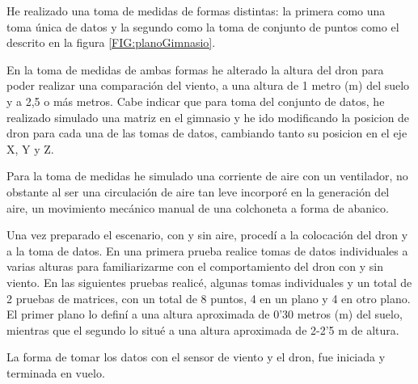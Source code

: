 
He realizado una toma de medidas de formas distintas: la primera como una toma única de datos y la segundo como la toma de conjunto de puntos como el descrito en la figura \ref{FIG:planoGimnasio}.

En la toma de medidas de ambas formas he alterado la altura del dron para poder realizar una comparación del viento, a una altura de 1 metro (m) del suelo y a 2,5 o más metros. Cabe indicar que para toma del conjunto de datos, he realizado simulado una matriz en el gimnasio y he ido modificando la posicion de dron para cada una de las tomas de datos, cambiando tanto su posicion en el eje X, Y y Z.

Para la toma de medidas he simulado una corriente de aire con un ventilador, no obstante al ser una circulación de aire tan leve incorporé en la generación del aire, un movimiento mecánico manual de una colchoneta a forma de abanico.

Una vez preparado el escenario, con y sin aire, procedí a la colocación del dron y a la toma de datos. En una primera prueba realice tomas de datos individuales a varias alturas para familiarizarme con el comportamiento del dron con y sin viento. En las siguientes pruebas realicé, algunas tomas individuales y un total de 2 pruebas de matrices, con un total de 8 puntos, 4 en un plano y 4 en otro plano. El primer plano lo definí a una altura aproximada de 0'30 metros (m) del suelo, mientras que el segundo lo situé a una altura aproximada de 2-2'5 m de altura. 

La forma de tomar los datos con el sensor de viento y el dron, fue iniciada y terminada en vuelo.
